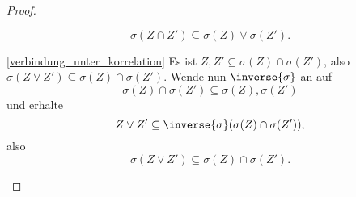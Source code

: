 \begin{proof}
\begin{proofdescription}
\begin{equation*}
        \sigma(Z\cap Z')\subseteq \sigma(Z)\vee \sigma(Z').
      \end{equation*}
      \item[\ref{verbindung_unter_korrelation}] Es ist \( Z,Z'\subseteq \sigma(Z)\cap \sigma(Z') \), also \( \sigma(Z\vee Z')\subseteq \sigma(Z)\cap \sigma(Z') \). Wende nun \( \inverse{\sigma} \) an auf
      \begin{equation*}
        \sigma(Z)\cap \sigma(Z')\subseteq \sigma(Z),\sigma(Z')
      \end{equation*}
      und erhalte
      \begin{equation*}
        Z\vee Z'\subseteq \inverse{\sigma}(\sigma(Z)\cap \sigma(Z')),
      \end{equation*}
      also
      \begin{equation*}
        \sigma(Z\vee Z')\subseteq \sigma(Z)\cap \sigma(Z').
      \end{equation*}
  \end{proofdescription}  
\end{proof}